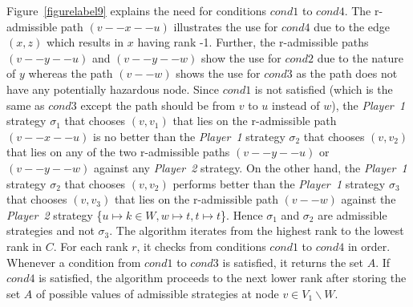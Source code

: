 Figure~\ref{figurelabel9} explains the need for conditions $cond1$ to
$cond4$. The r-admissible path $(v--x--u)$ illustrates the use for
$cond4$ due to the edge $(x,z)$ which results in $x$ having rank
-1. Further, the r-admissible paths $(v--y--u)$ and $(v--y--w)$ show
the use for $cond2$ due to the nature of $y$ whereas the path
$(v--w)$ shows the use for $cond3$ as the path does not have any
potentially hazardous node. Since $cond1$ is not satisfied (which is
the same as $cond3$ except the path should be from $v$ to $u$ instead
of $w$), the \textit{Player~1} strategy $\sigma_{1}$ that chooses
$(v,v_{1})$ that lies on the r-admissible path $(v--x--u)$ is no
better than the \textit{Player~1} strategy $\sigma_{2}$ that chooses
$(v,v_{2})$ that lies on any of the two r-admissible paths
$(v--y--u)$ or $(v--y--w)$ against any \textit{Player~2} strategy. On
the other hand, the \textit{Player~1} strategy $\sigma_{2}$ that
chooses $(v,v_{2})$ performs better than the \textit{Player~1}
strategy $\sigma_{3}$ that chooses $(v,v_{3})$ that lies on the
r-admissible path $(v--w)$ against the \textit{Player~2} strategy
\{$u \mapsto k\in W, w \mapsto t, t \mapsto t$\}. Hence $\sigma_{1}$
and $\sigma_{2}$ are admissible strategies and not $\sigma_{3}$. The
algorithm iterates from the highest rank to the lowest rank in
$C$. For each rank $r$, it checks from conditions $cond1$ to $cond4$
in order. Whenever a condition from $cond1$ to $cond3$ is satisfied,
it returns the set $A$. If $cond4$ is satisfied, the algorithm
proceeds to the next lower rank after storing the set $A$ of possible
values of admissible strategies at node $v \in V_{1} \backslash W$.
